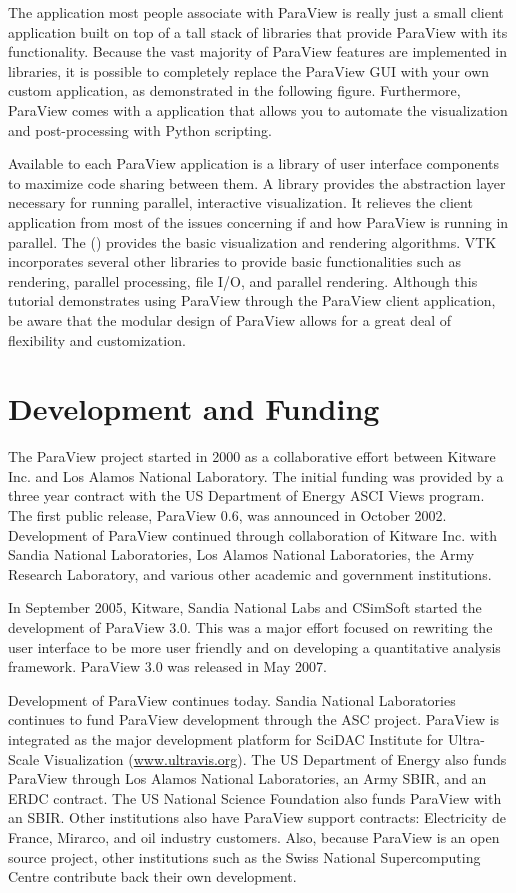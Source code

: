 The application most people associate with ParaView is really just a small
client application built on top of a tall stack of libraries that provide
ParaView with its functionality.  Because the vast majority of ParaView
features are implemented in libraries, it is possible to completely replace
the ParaView GUI with your own custom application, as demonstrated in the
following figure.  Furthermore, ParaView comes with a 
application that allows you to automate the visualization and
post-processing with Python scripting.

Available to each ParaView application is a library of user interface
components to maximize code sharing between them.  A  library provides the abstraction layer necessary for running
parallel, interactive visualization.  It relieves the client application
from most of the issues concerning if and how ParaView is running in
parallel.  The  () provides the
basic visualization and rendering algorithms.  VTK incorporates several
other libraries to provide basic functionalities such as rendering,
parallel processing, file I/O, and parallel rendering.  Although this
tutorial demonstrates using ParaView through the ParaView client
application, be aware that the modular design of ParaView allows for a
great deal of flexibility and customization.

\section{Development and Funding}

The ParaView project started in 2000 as a collaborative effort between
Kitware Inc. and Los Alamos National Laboratory. The initial funding was
provided by a three year contract with the US Department of Energy ASCI
Views program.  The first public release, ParaView 0.6, was announced in
October 2002.  Development of ParaView continued through collaboration of
Kitware Inc. with Sandia National Laboratories, Los Alamos National
Laboratories, the Army Research Laboratory, and various other academic and
government institutions.

In September 2005, Kitware, Sandia National Labs and CSimSoft started the
development of ParaView 3.0. This was a major effort focused on rewriting
the user interface to be more user friendly and on developing a
quantitative analysis framework. ParaView 3.0 was released in May 2007.

Development of ParaView continues today.  Sandia National Laboratories
continues to fund ParaView development through the ASC project.  ParaView
is integrated as the major development platform for SciDAC Institute for
Ultra-Scale Visualization
(\href{http://www.ultravis.org}{www.ultravis.org}).  The US Department of
Energy also funds ParaView through Los Alamos National Laboratories, an
Army SBIR, and an ERDC contract.  The US National Science Foundation also
funds ParaView with an SBIR.  Other institutions also have ParaView support
contracts: Electricity de France, Mirarco, and oil industry customers.
Also, because ParaView is an open source project, other institutions such
as the Swiss National Supercomputing Centre contribute back their own
development.


